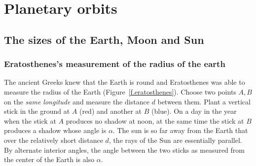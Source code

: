 

\part{Planetary orbits}


\chapter{The sizes of the Earth, Moon and Sun}\label{s.aristarchus}


\section{Eratosthenes's measurement of the radius of the earth}\label{s.eratosthenes}

The ancient Greeks knew that the Earth is round and Eratosthenes was able to measure the radius of the Earth (Figure~\ref{f.eratosthenes}). Choose two points $A,B$ on the \emph{same longitude} and measure the distance $d$ between them. Plant a vertical stick in the ground at $A$ (red) and another at $B$ (blue). On a day in the year when the stick at $A$ produces no shadow at noon, at the same time the stick at $B$ produces a shadow whose angle is $\alpha$. The sun is so far away from the Earth that over the relatively short distance $d$, the rays of the Sun are essentially parallel. By alternate interior angles, the angle between the two sticks as measured from the center of the Earth is also $\alpha$.

